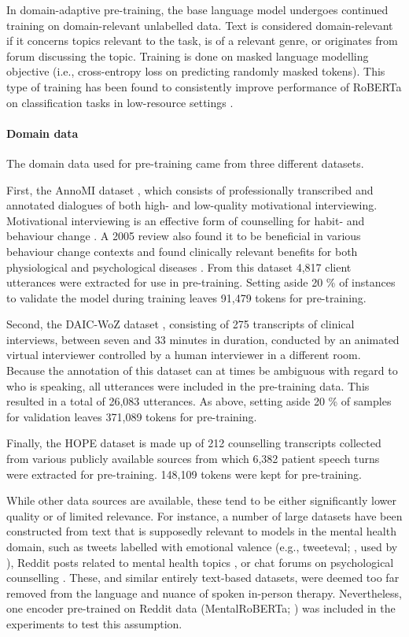 \documentclass[12pt]{report}
\begin{document}
In domain-adaptive pre-training, the base language model undergoes continued training on domain-relevant unlabelled data.
Text is considered domain-relevant if it concerns topics relevant to the task, is of a relevant genre, or originates from forum discussing the topic.
Training is done on masked language modelling objective (i.e., cross-entropy loss on predicting randomly masked tokens).
This type of training has been found to consistently improve performance of RoBERTa on classification tasks in low-resource settings \cite{Gururangan2020}.

\paragraph*{Domain data}
The domain data used for pre-training came from three different datasets.

First, the AnnoMI dataset \cite{Wu2022}, which consists of professionally transcribed and annotated dialogues of both high- and low-quality motivational interviewing.
Motivational interviewing is an effective form of counselling for habit- and behaviour change \cite{Apodaca2014, Gillam2019}.
A 2005 review also found it to be beneficial in various behaviour change contexts and found clinically relevant benefits for both physiological and psychological diseases \cite{Rubak2005}.
From this dataset 4,817 client utterances were extracted for use in pre-training.
Setting aside 20 \% of instances to validate the model during training leaves 91,479 tokens for pre-training.

Second, the DAIC-WoZ dataset \cite{Gratch2014}, consisting of 275 transcripts of clinical interviews, between seven and 33 minutes in duration, conducted by an animated virtual interviewer controlled by a human interviewer in a different room.
Because the annotation of this dataset can at times be ambiguous with regard to who is speaking, all utterances were included in the pre-training data.
This resulted in a total of 26,083 utterances. As above, setting aside 20 \% of samples for validation leaves 371,089 tokens for pre-training.

Finally, the HOPE dataset \cite{Malhotra2022} is made up of 212 counselling transcripts collected from various publicly available sources from which 6,382 patient speech turns were extracted for pre-training.
148,109 tokens were kept for pre-training.

While other data sources are available, these tend to be either significantly lower quality or of limited relevance.
For instance, a number of large datasets have been constructed from text that is supposedly relevant to models in the mental health domain, such as tweets labelled with emotional valence (e.g., tweeteval; , used by ), Reddit posts related to mental health topics \cite{Kim2020, MentalBERT}, or chat forums on psychological counselling \cite{counselchat}.
These, and similar entirely text-based datasets, were deemed too far removed from the language and nuance of spoken in-person therapy.
Nevertheless, one encoder pre-trained on Reddit data (MentalRoBERTa; ) was included in the experiments to test this assumption.
\end{document}
